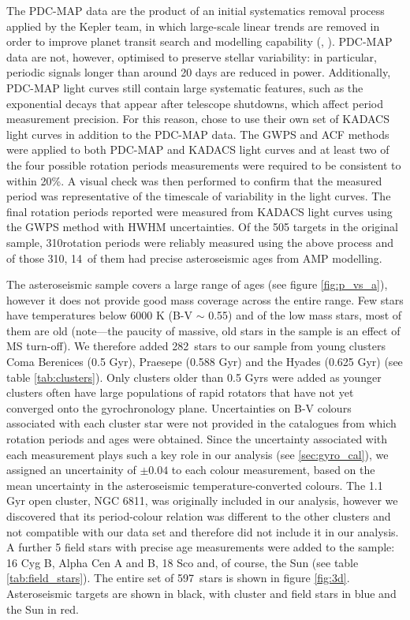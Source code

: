 \documentclass[10pt,preprint]{aastex}
\newcommand{\nastero}{310}
\newcommand{\nprecise}{14~}
\newcommand{\ncluster}{282~}
\newcommand{\ntotal}{597~}
\begin{document}
The PDC-MAP data are the product of an initial systematics removal process applied by the Kepler team, in which large-scale linear trends are removed in order to improve planet transit search and modelling capability (\citet{Smith_2012}, \citet{Stumpe_2012}).
PDC-MAP data are not, however, optimised to preserve stellar variability: in particular, periodic signals longer than around 20 days are reduced in power.
Additionally, PDC-MAP light curves still contain large systematic features, such as the exponential decays that appear after telescope shutdowns, which affect period measurement precision.
For this reason, \citet{Garcia2014} chose to use their own set of KADACS light curves in addition to the PDC-MAP data.
The GWPS and ACF methods were applied to both PDC-MAP and KADACS light curves and at least two of the four possible rotation periods measurements were required to be consistent to within 20\%.
A visual check was then performed to confirm that the measured period was representative of the timescale of variability in the light curves.
The final rotation periods reported were measured from KADACS light curves using the GWPS method with HWHM uncertainties.
Of the 505 targets in the original sample, \nastero rotation periods were reliably measured using the above process and of those \nastero, \nprecise of them had precise asteroseismic ages from AMP modelling.

The asteroseismic sample covers a large range of ages (see figure \ref{fig:p_vs_a}), however it does not provide good mass coverage across the entire range.
Few stars have temperatures below 6000 K (B-V $\sim$ 0.55) and of the low mass stars, most of them are old (note---the paucity of massive, old stars in the sample is an effect of MS turn-off).
We therefore added \ncluster stars to our sample from young clusters Coma Berenices (0.5 Gyr), Praesepe (0.588 Gyr) and the Hyades (0.625 Gyr) (see table \ref{tab:clusters}).
Only clusters older than 0.5 Gyrs were added as younger clusters often have large populations of rapid rotators that have not yet converged onto the gyrochronology plane.
Uncertainties on B-V colours associated with each cluster star were not provided in the catalogues from which rotation periods and ages were obtained.
Since the uncertainty associated with each measurement plays such a key role in our analysis (see \textsection \ref{sec:gyro_cal}), we assigned an uncertainity of $\pm 0.04$ to each colour measurement, based on the mean uncertainty in the asteroseismic temperature-converted colours.
The 1.1 Gyr open cluster, NGC 6811, was originally included in our analysis, however we discovered that its period-colour relation was different to the other clusters and not compatible with our data set and therefore did not include it in our analysis.
A further 5 field stars with precise age measurements were added to the sample: 16 Cyg B, Alpha Cen A and B, 18 Sco and, of course, the Sun (see table \ref{tab:field_stars}).
The entire set of \ntotal stars is shown in figure \ref{fig:3d}. Asteroseismic targets are shown in black, with cluster and field stars in blue and the Sun in red.
\end{document}
